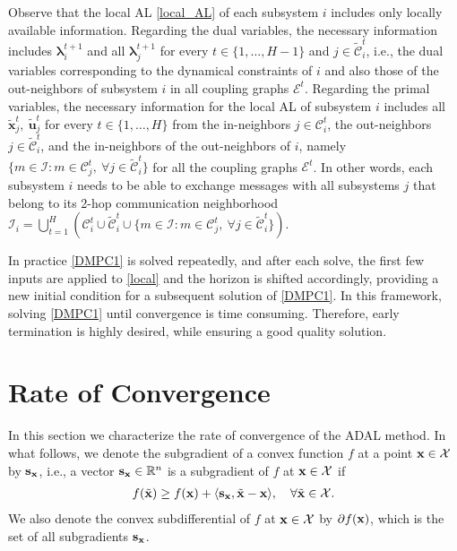 \documentclass[doublecolumn]{IEEEtran}
\begin{document}
Observe that the local AL \eqref{local_AL} of each subsystem $i$ includes only locally available information. Regarding  the dual variables, the necessary information includes ${\boldsymbol{\lambda}}_i^{t+1}$ and  all ${\boldsymbol{\lambda}}_j^{t+1}$ for every $t\in\{1,\dots,H-1\}$ and $j\in {\tilde{\mathcal{C}}}_i^t$, i.e., the dual variables corresponding to the dynamical constraints of $i$ and also those of the out-neighbors of subsystem $i$ in all coupling graphs $\mathcal{E}^t$. Regarding the primal variables, the necessary information for the local AL of subsystem $i$ includes all ${\tilde{\mathbf{x}}}^t_j,~{\tilde{\mathbf{u}}}^t_j$ for every $t\in\{1,\dots,H\}$ from the in-neighbors $j\in{\mathcal{C}}_i^t$, the out-neighbors $j\in{\tilde{\mathcal{C}}}_i^t$, and  the in-neighbors  of the out-neighbors of $i$, namely $\{m\in{ \mathcal{I} }: m\in{\mathcal{C}}_j^t, ~\forall j\in{\tilde{\mathcal{C}}}_i^t\}$ for all the coupling graphs $\mathcal{E}^t$. In other words, each subsystem $i$ needs to be able to exchange messages with all subsystems $j$ that belong to its 2-hop communication neighborhood ${ \mathcal{I} }_i = \bigcup_{t=1}^{H}\left( {\mathcal{C}}_i^t \cup {\tilde{\mathcal{C}}}_i^t \cup \{m\in{ \mathcal{I} }: m\in{\mathcal{C}}_j^t, ~\forall j\in{\tilde{\mathcal{C}}}_i^t\} \right)$.

In practice \eqref{DMPC1} is solved repeatedly, and after each solve, the first few inputs are applied to \eqref{local} and the horizon is shifted accordingly, providing a new initial condition for a subsequent solution of \eqref{DMPC1}. In this framework, solving \eqref{DMPC1} until convergence is time consuming. Therefore, early termination is highly desired, while ensuring a good quality solution.

\section{Rate of Convergence\label{sec:rate}}
In this section we characterize the rate of convergence of the ADAL method.
{{{In what follows, we denote the subgradient of a convex function $f$ at a point ${ {\bf x} } \in \mathcal{X}$ by ${\mathbf{s}}_{ {\bf x} }$, i.e.,
a vector ${\mathbf{s}}_{ {\bf x} } \in \mathbb{R}^n$ is a subgradient of $f$ at ${ {\bf x} } \in \mathcal{X}$ if
\begin{align*}
f({ \tilde{\bf x} }) \ge f({ {\bf x} }) + \langle {\mathbf{s}}_{ {\bf x} }, { \tilde{\bf x} }-{ {\bf x} }\rangle,\quad \forall { \tilde{\bf x} } \in \mathcal{X}.
\end{align*}
We also denote the convex subdifferential of $f$ at ${ {\bf x} } \in \mathcal{X}$ by $\partial f ({ {\bf x} })$,
which is the set of all subgradients ${\mathbf{s}}_{ {\bf x} }$.}}}
\end{document}
